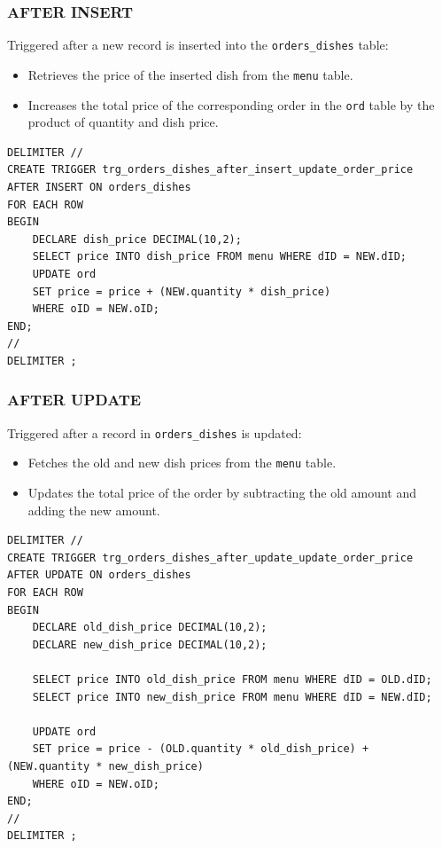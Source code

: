 \documentclass[12pt]{article}
\begin{document}
\subsubsection*{AFTER INSERT}

Triggered after a new record is inserted into the \texttt{orders\_dishes} table:
\begin{itemize}
    \item Retrieves the price of the inserted dish from the \texttt{menu} table.
    \item Increases the total price of the corresponding order in the \texttt{ord} table by the product of quantity and dish price.
\end{itemize}

\begin{lstlisting}
DELIMITER //
CREATE TRIGGER trg_orders_dishes_after_insert_update_order_price
AFTER INSERT ON orders_dishes
FOR EACH ROW
BEGIN
    DECLARE dish_price DECIMAL(10,2);
    SELECT price INTO dish_price FROM menu WHERE dID = NEW.dID;
    UPDATE ord
    SET price = price + (NEW.quantity * dish_price)
    WHERE oID = NEW.oID;
END;
//
DELIMITER ;
\end{lstlisting}

\subsubsection*{AFTER UPDATE}
Triggered after a record in \texttt{orders\_dishes} is updated:
\begin{itemize}
    \item Fetches the old and new dish prices from the \texttt{menu} table.
    \item Updates the total price of the order by subtracting the old amount and adding the new amount.
\end{itemize}

\begin{lstlisting}
DELIMITER //
CREATE TRIGGER trg_orders_dishes_after_update_update_order_price
AFTER UPDATE ON orders_dishes
FOR EACH ROW
BEGIN
    DECLARE old_dish_price DECIMAL(10,2);
    DECLARE new_dish_price DECIMAL(10,2);

    SELECT price INTO old_dish_price FROM menu WHERE dID = OLD.dID;
    SELECT price INTO new_dish_price FROM menu WHERE dID = NEW.dID;

    UPDATE ord
    SET price = price - (OLD.quantity * old_dish_price) + (NEW.quantity * new_dish_price)
    WHERE oID = NEW.oID;
END;
//
DELIMITER ;
\end{lstlisting}
\end{document}
